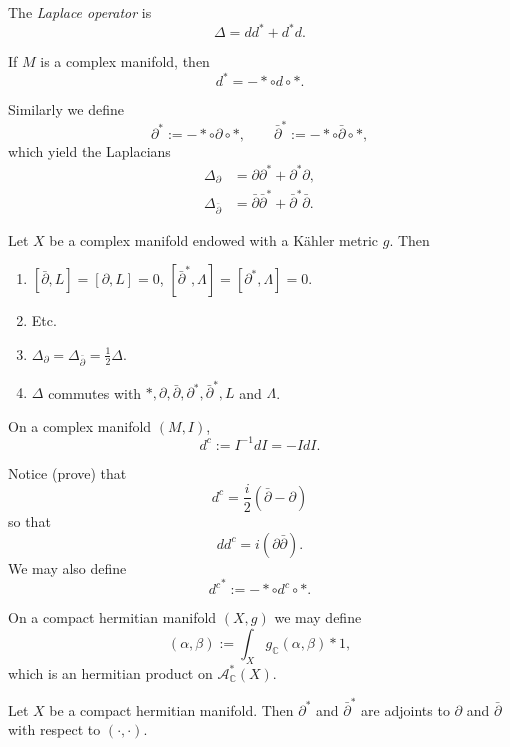 \begin{definition}
\label{definition-laplace}
The {\it Laplace operator} is
$$
\Delta=d d^*+d^*d.
$$
\end{definition}

\noindent
If $M$ is a complex manifold,
then
$$
d^*=-*\circ d \circ *.
$$

Similarly we define
$$
\partial^*:=-* \circ \partial \circ *,
\qquad 
\bar\partial^*:=-* \circ \bar\partial \circ *,
$$
which yield the Laplacians
\begin{align*}
\Delta_\partial&=\partial \partial^* +\partial^*\partial,\\
\Delta_{\bar\partial}&=\bar\partial \bar\partial^*+\bar\partial^*\bar\partial.
\end{align*}

\begin{proposition}
\label{proposition-kahler-identities}
Let $X$ be a complex manifold endowed with a Kähler metric $g$. Then
\begin{enumerate}
\item $[\bar\partial,L]=[\partial,L]=0$, 
$[\bar\partial^*,\Lambda]=[\partial^*,\Lambda]=0$.
\item  Etc.
\item $\Delta_\partial=\Delta_{\bar\partial}=\frac{1}{2}\Delta$.
\item $\Delta$ commutes with 
$*,\partial,\bar\partial,\partial^*,\bar\partial^*,L$ and $\Lambda$.
\end{enumerate}
\end{proposition}

\begin{definition}
\label{definition-dc}
On a complex manifold $(M,I)$,
$$
d^c:=I^{-1}d I=-I d I.
$$
\end{definition}

Notice (prove) that
$$
d^c=\frac{i}{2}(\bar\partial-\partial)
$$
so that
$$
dd^c=i(\partial \bar\partial).
$$
We may also define
$$
{d^c}^*:=-* \circ d^c \circ *.
$$


On a compact hermitian manifold $(X,g)$ we may define
$$
(\alpha,\beta):=\int_Xg_{\mathbb{C}}(\alpha,\beta)*1,
$$
which is an hermitian product on $\mathcal{A}_{\mathbb{C}}^*(X)$.

\begin{lemma}
\label{lemma-adjoints}
\begin{reference}
\cite[Lemma 3.2.3]{huc}
\end{reference}
Let $X$ be a compact hermitian manifold.
Then $\partial^*$ and $\bar\partial^*$
are adjoints to $\partial$ and $\bar\partial$ with respect to
$(\cdot,\cdot)$.
\end{lemma}

